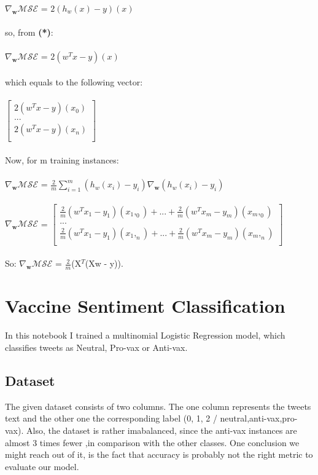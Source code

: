 \documentclass{article}
\begin{document}
$\nabla_{\!\mathbf{w}}\mathcal{MSE} $ = $2(h_w(x) - y)$$(x)$ \\ \\ 
so, from \textbf{(*)}:\\ \\
$\nabla_{\!\mathbf{w}}\mathcal{MSE} $ = $2(w^Tx - y)$$(x)$   \\ \\ 
which equals to the following vector: \\ \\
$
\begin{bmatrix}
2(w^Tx - y)(x_0)\\
. . .\\             
2(w^Tx - y)(x_n)\\
\end{bmatrix}
$ \\ \\
Now, for m training instances: \\ \\ 
$\nabla_{\!\mathbf{w}}\mathcal{MSE} $ = $\frac{2}{m}\sum_{i=1}^{m}(h_w(x_i) - y_i)\nabla_{\!\mathbf{w}}$$(h_w(x_i) - y_i)$ \\ \\
$\nabla_{\!\mathbf{w}}\mathcal{MSE} $ = $\begin{bmatrix}
\frac{2}{m}(w^Tx_1 - y_1)(x_1,_0) + ... + \frac{2}{m}(w^Tx_m - y_m)(x_m,_0) \\
. . .\\             
\frac{2}{m}(w^Tx_1 - y_1)(x_1,_n) + ... + \frac{2}{m}(w^Tx_m - y_m)(x_m,_n)\\
\end{bmatrix}
$ \\ \\ 
So: $\nabla_{\!\mathbf{w}}\mathcal{MSE} $ = $\frac{2}{m}$(X$^T$(Xw - y)).
\section{Vaccine Sentiment Classification}
In this notebook I trained a multinomial Logistic Regression model, which classifies tweets as Neutral, Pro-vax or Anti-vax.
\subsection{Dataset}
The given dataset consists of two columns. The one column represents the tweets text and the other one the corresponding label (0, 1, 2 / neutral,anti-vax,pro-vax). Also, the dataset is rather imabalanced, since the anti-vax instances are almost 3 times fewer ,in comparison with the other classes. One conclusion we might reach out of it, is the fact that accuracy is probably not the right metric to evaluate our model.
\end{document}
